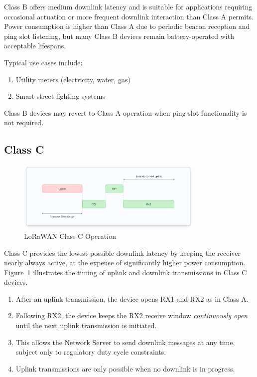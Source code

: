 Class B offers medium downlink latency and is suitable for applications requiring occasional actuation or more frequent downlink interaction than Class A permits. Power consumption is higher than Class A due to periodic beacon reception and ping slot listening, but many Class B devices remain battery-operated with acceptable lifespans.

Typical use cases include:

\begin{enumerate}
    \item Utility meters (electricity, water, gas)
    \item Smart street lighting systems
\end{enumerate}

Class B devices may revert to Class A operation when ping slot functionality is not required.

\subsection{Class C}
\begin{figure}
    \centering
    \includegraphics[width=0.8\textwidth]{figures/class-c.png}
    \caption{LoRaWAN Class C Operation}
    \label{fig:lora_class_c}
\end{figure}
Class C provides the lowest possible downlink latency by keeping the receiver nearly always active, at the expense of significantly higher power consumption.
Figure~\ref{fig:lora_class_c} illustrates the timing of uplink and downlink transmissions in Class C devices.

\begin{enumerate}
    \item After an uplink transmission, the device opens RX1 and RX2 as in Class A.
    \item Following RX2, the device keeps the RX2 receive window \emph{continuously open} until the next uplink transmission is initiated.
    \item This allows the Network Server to send downlink messages at any time, subject only to regulatory duty cycle constraints.
    \item Uplink transmissions are only possible when no downlink is in progress.
\end{enumerate}

